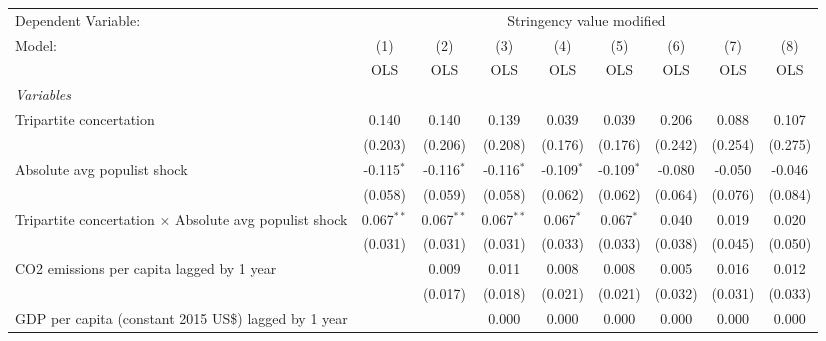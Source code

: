 
\begingroup
\centering
\begin{tabular}{lcccccccc}
   \toprule
   Dependent Variable: & \multicolumn{8}{c}{Stringency value modified}\\
   Model:                                                        & (1)          & (2)          & (3)          & (4)          & (5)          & (6)     & (7)          & (8)\\  
                                                                 &  OLS         & OLS          & OLS          & OLS          & OLS          & OLS     & OLS          & OLS\\  
   \midrule
   \emph{Variables}\\
   Tripartite concertation                                       & 0.140        & 0.140        & 0.139        & 0.039        & 0.039        & 0.206   & 0.088        & 0.107\\   
                                                                 & (0.203)      & (0.206)      & (0.208)      & (0.176)      & (0.176)      & (0.242) & (0.254)      & (0.275)\\   
   Absolute avg populist shock                                   & -0.115$^{*}$ & -0.116$^{*}$ & -0.116$^{*}$ & -0.109$^{*}$ & -0.109$^{*}$ & -0.080  & -0.050       & -0.046\\   
                                                                 & (0.058)      & (0.059)      & (0.058)      & (0.062)      & (0.062)      & (0.064) & (0.076)      & (0.084)\\   
   Tripartite concertation $\times$ Absolute avg populist shock  & 0.067$^{**}$ & 0.067$^{**}$ & 0.067$^{**}$ & 0.067$^{*}$  & 0.067$^{*}$  & 0.040   & 0.019        & 0.020\\   
                                                                 & (0.031)      & (0.031)      & (0.031)      & (0.033)      & (0.033)      & (0.038) & (0.045)      & (0.050)\\   
   CO2 emissions per capita lagged by 1 year                     &              & 0.009        & 0.011        & 0.008        & 0.008        & 0.005   & 0.016        & 0.012\\   
                                                                 &              & (0.017)      & (0.018)      & (0.021)      & (0.021)      & (0.032) & (0.031)      & (0.033)\\   
   GDP per capita (constant 2015 US\$) lagged by 1 year          &              &              & 0.000        & 0.000        & 0.000        & 0.000   & 0.000        & 0.000\\   

\end{tabular}
